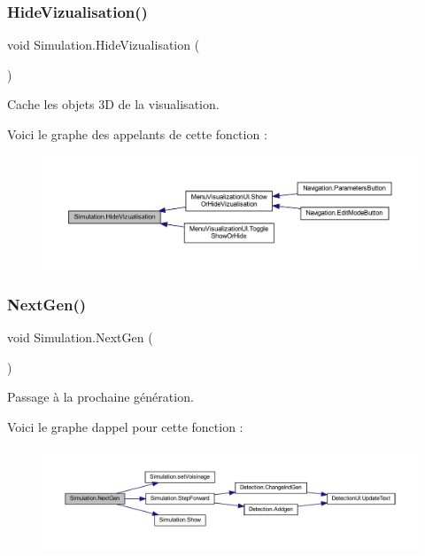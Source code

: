 \subsubsection{\texorpdfstring{Hide\+Vizualisation()}{HideVizualisation()}}
{\footnotesize\ttfamily void Simulation.\+Hide\+Vizualisation (\begin{DoxyParamCaption}{ }\end{DoxyParamCaption})\hspace{0.3cm}{\ttfamily [inline]}}



Cache les objets 3D de la visualisation. 

Voici le graphe des appelants de cette fonction \+:
\nopagebreak
\begin{figure}[H]
\begin{center}
\leavevmode
\includegraphics[width=350pt]{class_simulation_a71a9e0a93e05353ff243f4c48afa67d0_icgraph}
\end{center}
\end{figure}
\mbox{\label{class_simulation_a6027638c71846ed03d560cd75d8a92d6}} 
\subsubsection{\texorpdfstring{Next\+Gen()}{NextGen()}}
{\footnotesize\ttfamily void Simulation.\+Next\+Gen (\begin{DoxyParamCaption}{ }\end{DoxyParamCaption})\hspace{0.3cm}{\ttfamily [inline]}}



Passage à la prochaine génération. 

Voici le graphe d\textquotesingle{}appel pour cette fonction \+:
\nopagebreak
\begin{figure}[H]
\begin{center}
\leavevmode
\includegraphics[width=350pt]{class_simulation_a6027638c71846ed03d560cd75d8a92d6_cgraph}
\end{center}
\end{figure}
\mbox{\label{class_simulation_ab668bfea667549d1295fc55f5ccfbc4a}} 
